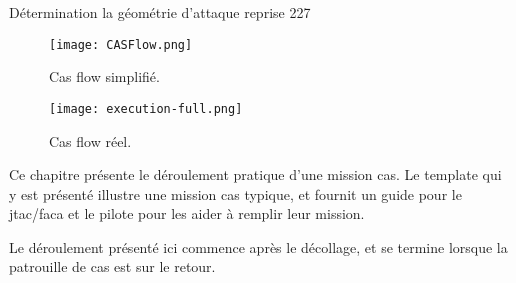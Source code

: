 			\ed
       	\ed
    \ed
    \item Détermination la géométrie d'attaque reprise 227 %
\ed
    \begin{figure}[H]
        \texttt{[image: CASFlow.png]}
        \caption{Cas flow simplifié.}
        \label{fig:casflow}
    \end{figure}
    \begin{figure}[H]
        \texttt{[image: execution-full.png]}
        \caption{Cas flow réel.}
        \label{fig:casflow-full}
    \end{figure}


\e
    \item
    Ce chapitre présente le déroulement pratique d’une mission \acrshort{cas}. Le template qui y est présenté illustre une mission \acrshort{cas} typique, et fournit un guide pour le \acrshort{jtac}/\acrshort{faca} et le pilote pour les aider à remplir leur mission.
    \item Le déroulement présenté ici commence après le décollage, et se termine lorsque la patrouille de \acrshort{cas} est sur le retour.
\ed

